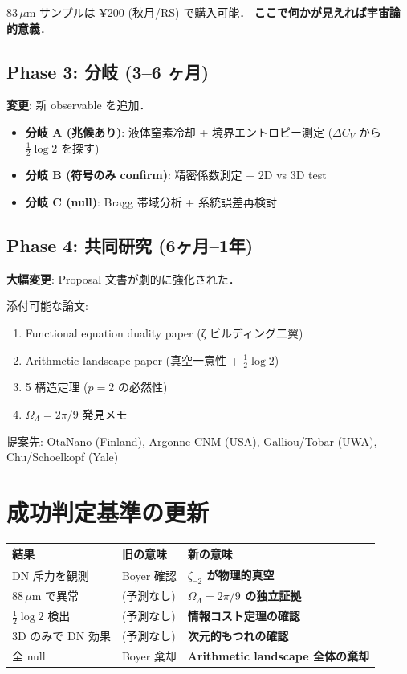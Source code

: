 \documentclass[11pt,a4paper]{article}
\begin{document}
83\,$\mu$m サンプルは ¥200 (秋月/RS) で購入可能．
\textbf{ここで何かが見えれば宇宙論的意義}．

\subsection{Phase 3: 分岐 (3--6 ヶ月)}

\textbf{変更}: 新 observable を追加．

\begin{itemize}
\item \textbf{分岐 A (兆候あり)}: 液体窒素冷却 + 境界エントロピー測定
($\Delta C_V$ から $\frac{1}{2}\log 2$ を探す)
\item \textbf{分岐 B (符号のみ confirm)}: 精密係数測定 + 2D vs 3D test
\item \textbf{分岐 C (null)}: Bragg 帯域分析 + 系統誤差再検討
\end{itemize}

\subsection{Phase 4: 共同研究 (6ヶ月--1年)}

\textbf{大幅変更}: Proposal 文書が劇的に強化された．

添付可能な論文:
\begin{enumerate}
\item Functional equation duality paper (ζ ビルディング二翼)
\item Arithmetic landscape paper (真空一意性 + $\frac{1}{2}\log 2$)
\item 5 構造定理 ($p=2$ の必然性)
\item $\Omega_\Lambda = 2\pi/9$ 発見メモ
\end{enumerate}

提案先: OtaNano (Finland), Argonne CNM (USA), Galliou/Tobar (UWA),
Chu/Schoelkopf (Yale)

\section{成功判定基準の更新}

\begin{center}
\begin{tabular}{lll}
\toprule
結果 & 旧の意味 & 新の意味 \\
\midrule
DN 斥力を観測 & Boyer 確認 & \textbf{$\zeta_{\neg 2}$ が物理的真空} \\
88\,$\mu$m で異常 & (予測なし) & \textbf{$\Omega_\Lambda = 2\pi/9$ の独立証拠} \\
$\frac{1}{2}\log 2$ 検出 & (予測なし) & \textbf{情報コスト定理の確認} \\
3D のみで DN 効果 & (予測なし) & \textbf{次元的もつれの確認} \\
全 null & Boyer 棄却 & \textbf{Arithmetic landscape 全体の棄却} \\
\bottomrule
\end{tabular}
\end{center}
\end{document}
